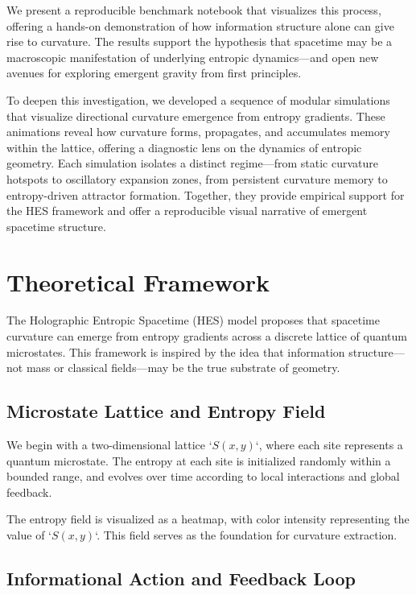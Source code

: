 \documentclass[12pt]{article}
\begin{document}
We present a reproducible benchmark notebook that visualizes this process, offering a hands-on demonstration of how information structure alone can give rise to curvature. The results support the hypothesis that spacetime may be a macroscopic manifestation of underlying entropic dynamics—and open new avenues for exploring emergent gravity from first principles.

To deepen this investigation, we developed a sequence of modular simulations that visualize directional curvature emergence from entropy gradients. These animations reveal how curvature forms, propagates, and accumulates memory within the lattice, offering a diagnostic lens on the dynamics of entropic geometry. Each simulation isolates a distinct regime—from static curvature hotspots to oscillatory expansion zones, from persistent curvature memory to entropy-driven attractor formation. Together, they provide empirical support for the HES framework and offer a reproducible visual narrative of emergent spacetime structure.


\section{Theoretical Framework}

The Holographic Entropic Spacetime (HES) model proposes that spacetime curvature can emerge from entropy gradients across a discrete lattice of quantum microstates. This framework is inspired by the idea that information structure—not mass or classical fields—may be the true substrate of geometry.

\subsection{Microstate Lattice and Entropy Field}

We begin with a two-dimensional lattice `\( S(x, y) \)`, where each site represents a quantum microstate. The entropy at each site is initialized randomly within a bounded range, and evolves over time according to local interactions and global feedback.

The entropy field is visualized as a heatmap, with color intensity representing the value of `\( S(x, y) \)`. This field serves as the foundation for curvature extraction.

\subsection{Informational Action and Feedback Loop}
\end{document}
